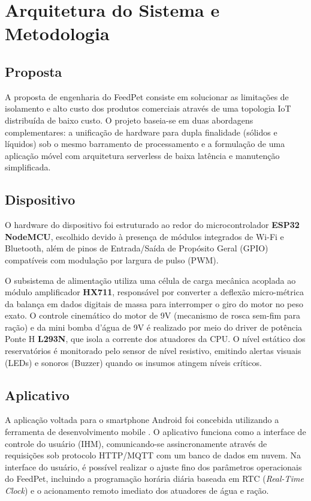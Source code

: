 \documentclass[12pt]{article}
\begin{document}
\section{Arquitetura do Sistema e Metodologia}

\subsection{Proposta}
A proposta de engenharia do FeedPet consiste em solucionar as limitações de isolamento e alto custo dos produtos comerciais através de uma topologia IoT distribuída de baixo custo. O projeto baseia-se em duas abordagens complementares: a unificação de hardware para dupla finalidade (sólidos e líquidos) sob o mesmo barramento de processamento e a formulação de uma aplicação móvel com arquitetura serverless de baixa latência e manutenção simplificada.

\subsection{Dispositivo}
O hardware do dispositivo foi estruturado ao redor do microcontrolador \textbf{ESP32 NodeMCU}, escolhido devido à presença de módulos integrados de Wi-Fi e Bluetooth, além de pinos de Entrada/Saída de Propósito Geral (GPIO) compatíveis com modulação por largura de pulso (PWM). 

O subsistema de alimentação utiliza uma célula de carga mecânica acoplada ao módulo amplificador \textbf{HX711}, responsável por converter a deflexão micro-métrica da balança em dados digitais de massa para interromper o giro do motor no peso exato. O controle cinemático do motor de 9V (mecanismo de rosca sem-fim para ração) e da mini bomba d'água de 9V é realizado por meio do driver de potência Ponte H \textbf{L293N}, que isola a corrente dos atuadores da CPU. O nível estático dos reservatórios é monitorado pelo sensor de nível resistivo, emitindo alertas visuais (LEDs) e sonoros (Buzzer) quando os insumos atingem níveis críticos.

\subsection{Aplicativo}
A aplicação voltada para o smartphone Android foi concebida utilizando a ferramenta de desenvolvimento mobile \cite{pandasuite:26}. O aplicativo funciona como a interface de controle do usuário (IHM), comunicando-se assincronamente através de requisições sob protocolo HTTP/MQTT com um banco de dados em nuvem. Na interface do usuário, é possível realizar o ajuste fino dos parâmetros operacionais do FeedPet, incluindo a programação horária diária baseada em RTC (\textit{Real-Time Clock}) e o acionamento remoto imediato dos atuadores de água e ração.
\end{document}
